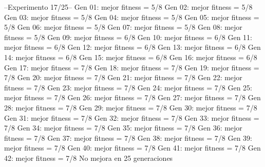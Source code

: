 --Experimento 
 17/25--
Gen 01: mejor fitness = 5/8
Gen 02: mejor fitness = 5/8
Gen 03: mejor fitness = 5/8
Gen 04: mejor fitness = 5/8
Gen 05: mejor fitness = 5/8
Gen 06: mejor fitness = 5/8
Gen 07: mejor fitness = 5/8
Gen 08: mejor fitness = 5/8
Gen 09: mejor fitness = 6/8
Gen 10: mejor fitness = 6/8
Gen 11: mejor fitness = 6/8
Gen 12: mejor fitness = 6/8
Gen 13: mejor fitness = 6/8
Gen 14: mejor fitness = 6/8
Gen 15: mejor fitness = 6/8
Gen 16: mejor fitness = 6/8
Gen 17: mejor fitness = 7/8
Gen 18: mejor fitness = 7/8
Gen 19: mejor fitness = 7/8
Gen 20: mejor fitness = 7/8
Gen 21: mejor fitness = 7/8
Gen 22: mejor fitness = 7/8
Gen 23: mejor fitness = 7/8
Gen 24: mejor fitness = 7/8
Gen 25: mejor fitness = 7/8
Gen 26: mejor fitness = 7/8
Gen 27: mejor fitness = 7/8
Gen 28: mejor fitness = 7/8
Gen 29: mejor fitness = 7/8
Gen 30: mejor fitness = 7/8
Gen 31: mejor fitness = 7/8
Gen 32: mejor fitness = 7/8
Gen 33: mejor fitness = 7/8
Gen 34: mejor fitness = 7/8
Gen 35: mejor fitness = 7/8
Gen 36: mejor fitness = 7/8
Gen 37: mejor fitness = 7/8
Gen 38: mejor fitness = 7/8
Gen 39: mejor fitness = 7/8
Gen 40: mejor fitness = 7/8
Gen 41: mejor fitness = 7/8
Gen 42: mejor fitness = 7/8
No mejora en 25 generaciones

